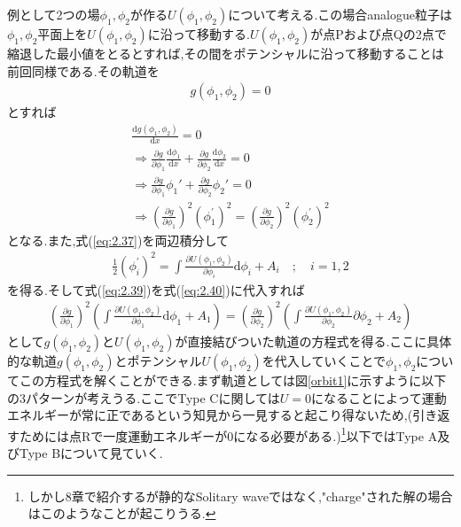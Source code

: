 \documentclass[dvipdfmx,11pt,a4paper]{jsbook}
\begin{document}
例として2つの場$\phi_1, \phi_2$が作る$U(\phi_1, \phi_2)$について考える.この場合analogue粒子は$\phi_1,\phi_2$平面上を$U(\phi_1,\phi_2)$に沿って移動する.$U(\phi_1,\phi_2)$が点Pおよび点Qの2点で縮退した最小値をとるとすれば,その間をポテンシャルに沿って移動することは前回同様である.その軌道を
\begin{align}
    g(\phi_1,\phi_2)=0
\end{align}
とすれば
\begin{align}
    \frac{\mathrm{d}g(\phi_1,\phi_2)}{\mathrm{d}x}=0\nonumber                                                                                                            \\
    \Rightarrow \frac{\partial g}{\partial \phi_1}\frac{\mathrm{d}\phi_1}{\mathrm{d}x}+\frac{\partial g}{\partial \phi_2}\frac{\mathrm{d}\phi_2}{\mathrm{d}x}=0\nonumber \\
    \Rightarrow \frac{\partial g}{\partial \phi_1}\phi_1'+\frac{\partial g}{\partial \phi_2}\phi_2'=0\nonumber                                                           \\
    \Rightarrow \left(\frac{\partial g}{\partial \phi_{1}}\right)^{2}\left(\phi_{1}^{'}\right)^{2}=\left(\frac{\partial g}{\partial \phi_{2}}\right)^{2}\left(\phi_{2}^{'}\right)^{2}\label{eq:2.39}
\end{align}
となる.また,式(\ref{eq:2.37})を両辺積分して
\begin{align}
    \frac{1}{2}\left(\phi_{i}^{'}\right)^{2}=\int \frac{\partial U\left(\phi_{1}, \phi_{2}\right)}{\partial \phi_{i}} \mathrm{d} \phi_{i}+A_{i}\quad; \quad i=1,2\label{eq:2.40}
\end{align}
を得る.そして式(\ref{eq:2.39})を式(\ref{eq:2.40})に代入すれば
\begin{align}
    \left(\frac{\partial g}{\partial \phi_{1}}\right)^{2}\left(\int \frac{\partial U\left(\phi_{1}, \phi_{2}\right)}{\partial \phi_{1}} \mathrm{d} \phi_{1}+A_{1}\right)=\left(\frac{\partial g}{\partial \phi_{2}}\right)^{2}\left(\int \frac{\partial U\left(\phi_{1}, \phi_{2}\right)}{\partial \phi_{2}} \partial \phi_{2}+A_{2}\right)\label{eq:2.41}
\end{align}
として$g(\phi_1,\phi_2)$と$U(\phi_1,\phi_2)$が直接結びついた軌道の方程式を得る.ここに具体的な軌道$g(\phi_1,\phi_2)$とポテンシャル$U(\phi_1,\phi_2)$を代入していくことで$\phi_1,\phi_2$についてこの方程式を解くことができる.まず軌道としては図\ref{orbit1}に示すように以下の3パターンが考えうる.ここでType Cに関しては$U=0$になることによって運動エネルギーが常に正であるという知見から一見すると起こり得ないため,(引き返すためには点Rで一度運動エネルギーが0になる必要がある.)\footnote{しかし8章で紹介するが静的なSolitary waveではなく,"charge"された解の場合はこのようなことが起こりうる.}以下ではType A及びType Bについて見ていく.
\end{document}
